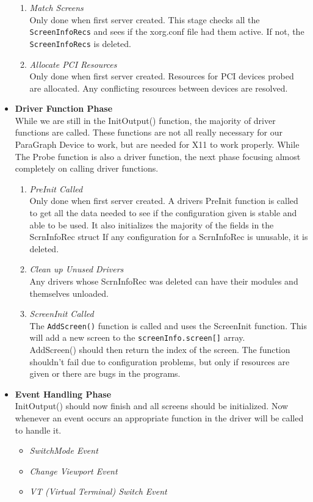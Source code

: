 \documentclass{acm_proc_article-sp}
\begin{document}
\begin{itemize}
\begin{enumerate}
\item \textit{Match Screens} \\
Only done when first server created. This stage checks all the {\tt ScreenInfoRecs} and sees if the xorg.conf file had them active. If not, the {\tt ScreenInfoRecs} is deleted. \cite{xorgman}
\item \textit{Allocate PCI Resources} \\
Only done when first server created.
Resources for PCI devices probed are allocated. Any conflicting resources between devices are resolved. \cite{xorgman}
\end{enumerate}

\item \textbf{Driver Function Phase} \\
While we are still in the InitOutput() function, the majority of driver functions are called. These functions are not all really necessary for our ParaGraph Device to work, but are needed for X11 to work properly. While The Probe function is also a driver function, the next phase focusing almost completely on calling driver functions. 

\begin{enumerate}
\item \textit{PreInit Called} \\
Only done when first server created.
A drivers PreInit function is called to get all the data needed to see if the configuration given is stable and able to be used. It also initializes the majority of the fields in the ScrnInfoRec struct If any configuration for a ScrnInfoRec is unusable, it is deleted. \cite{xorgman}
\item \textit{Clean up Unused Drivers} \\
Any drivers whose ScrnInfoRec was deleted can have their modules and themselves unloaded. \cite{xorgman}
\item \textit{ScreenInit Called} \\
The {\tt AddScreen()} function is called and uses the ScreenInit function. This will add a new screen to the {\tt screenInfo.screen[]} array. \\ AddScreen() should then return the index of the screen. The function shouldn't fail due to configuration problems, but only if resources are given or there are bugs in the programs. \cite{xorgman}
\end{enumerate}
\item \textbf{Event Handling Phase} \\
InitOutput() should now finish and all screens should be initialized. Now whenever an event occurs an appropriate function in the driver will be called to handle it. 
\begin{itemize}
\item \textit{SwitchMode Event}
\item \textit{Change Viewport Event}
\item \textit{VT (Virtual Terminal) Switch Event}
\end{itemize}
\end{itemize}
\end{document}
